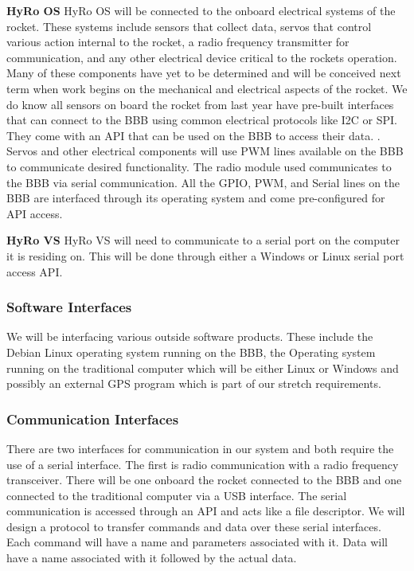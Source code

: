 \documentclass[10pt,draftclsnofoot,onecolumn,compsoc]{IEEEtran}
\begin{document}
{\bf HyRo OS}
 	HyRo OS will be connected to the onboard electrical systems of the rocket. These systems include sensors that collect data, servos that control various action internal to the rocket, a radio frequency transmitter for communication, and any other electrical device critical to the rockets operation. Many of these components have yet to be determined and will be conceived next term when work begins on the mechanical and electrical aspects of the rocket.  We do know all sensors on board the rocket from last year have pre-built interfaces that can connect to the BBB using common electrical protocols like I2C or SPI. They come with an API that can be used on the BBB to access their data. . Servos and other electrical components will use PWM lines available on the BBB to communicate desired functionality. The radio module used communicates to the BBB via serial communication. All the GPIO, PWM, and Serial lines on the BBB are interfaced through its operating system and come pre-configured for API access.\par

{\bf HyRo VS}
HyRo VS will need to communicate to a serial port on the computer it is residing on.  This will be done through either a Windows or Linux serial port access API.

\subsubsection{Software Interfaces}
	We will be interfacing various outside software products. These include the Debian Linux operating system running on the BBB, the Operating system running on the traditional computer which will be either Linux or Windows and possibly an external GPS program which is part of our stretch requirements.

\subsubsection{Communication Interfaces}
There are two interfaces for communication in our system and both require the use of a serial interface. The first is radio communication with a radio frequency transceiver. There will be one onboard the rocket connected to the BBB and one connected to the traditional computer via a USB interface. The serial communication is accessed through an API and acts like a file descriptor. We will design a protocol to transfer commands and data over these serial interfaces. Each command will have a name and parameters associated with it. Data will have a name associated with it followed by the actual data.
\end{document}
